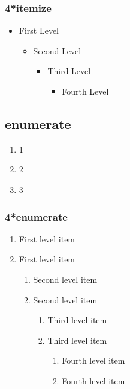 \subsubsection{4*itemize}

\begin{itemize}
  \item  First Level
        \begin{itemize}
          \item  Second Level
                \begin{itemize}
                  \item  Third Level
                        \begin{itemize}
                          \item  Fourth Level
                        \end{itemize}
                \end{itemize}
        \end{itemize}
\end{itemize}

\subsection{enumerate}

\begin{enumerate}
  \item 1
  \item 2
  \item 3
\end{enumerate}

\subsubsection{4*enumerate}

\begin{enumerate}
  \item First level item
  \item First level item
        \begin{enumerate}
          \item Second level item
          \item Second level item
                \begin{enumerate}
                  \item Third level item
                  \item Third level item
                        \begin{enumerate}
                          \item Fourth level item
                          \item Fourth level item
                        \end{enumerate}
                \end{enumerate}
        \end{enumerate}
\end{enumerate}

